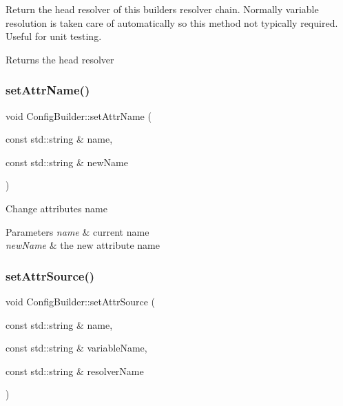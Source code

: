 Return the head resolver of this builder\textquotesingle{}s resolver chain. Normally variable resolution is taken care of automatically so this method not typically required. Useful for unit testing. \begin{DoxyReturn}{Returns}
the head resolver 
\end{DoxyReturn}
\mbox{\label{classtheoria_1_1config_1_1ConfigBuilder_a267121aec4f3c65ff88eb36d691ce509}} 
\subsubsection{\texorpdfstring{set\+Attr\+Name()}{setAttrName()}}
{\footnotesize\ttfamily void Config\+Builder\+::set\+Attr\+Name (\begin{DoxyParamCaption}\item[{const std\+::string \&}]{name,  }\item[{const std\+::string \&}]{new\+Name }\end{DoxyParamCaption})}

Change attributes name 
\begin{DoxyParams}{Parameters}
{\em name} & current name \\
\hline
{\em new\+Name} & the new attribute name \\
\hline
\end{DoxyParams}
\mbox{\label{classtheoria_1_1config_1_1ConfigBuilder_af30b50a47285d06afae1b74edfb4d762}} 
\subsubsection{\texorpdfstring{set\+Attr\+Source()}{setAttrSource()}}
{\footnotesize\ttfamily void Config\+Builder\+::set\+Attr\+Source (\begin{DoxyParamCaption}\item[{const std\+::string \&}]{name,  }\item[{const std\+::string \&}]{variable\+Name,  }\item[{const std\+::string \&}]{resolver\+Name }\end{DoxyParamCaption})}

